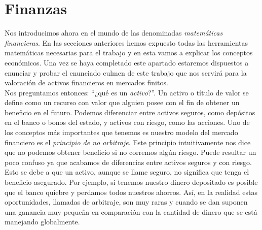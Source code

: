 \chapter{Finanzas}

Nos introducimos ahora en el mundo de las denominadas \textit{matemáticas financieras}. En las secciones anteriores hemos expuesto todas las herramientas matemáticas necesarias para el trabajo y en esta vamos a explicar los conceptos económicos. Una vez se haya completado este apartado estaremos dispuestos a enunciar y probar el enunciado culmen de este trabajo que nos servirá para la valoración de activos financieros en mercados finitos. \\

Nos preguntamos entonces: ``¿qué es un \textit{activo}?''. Un activo o título de valor se define como un recurso con valor que alguien posee con el fin de obtener un beneficio en el futuro. Podemos diferenciar entre activos seguros, como depósitos en el banco o bonos del estado, y activos con riesgo, como las acciones. Uno de los conceptos más importantes que tenemos es nuestro modelo del mercado financiero es el \textit{principio de no arbitraje}. Este principio intuitivamente nos dice que no podemos obtener beneficio si no corremos algún riesgo. Puede resultar un poco confuso ya que acabamos de diferencias entre activos seguros y con riesgo. Esto se debe a que un activo, aunque se llame seguro, no significa que tenga el  beneficio asegurado. Por ejemplo, si tenemos nuestro dinero depositado es posible que el banco quiebre y perdamos todos nuestros ahorros. Así, en la realidad estas oportunidades, llamadas de arbitraje, son muy raras y cuando se dan suponen una ganancia muy pequeña en comparación con la cantidad de dinero que se está manejando globalmente. \\

